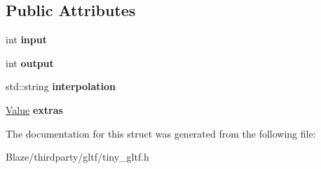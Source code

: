 \subsection*{Public Attributes}
\begin{DoxyCompactItemize}
\item 
\mbox{\label{structtinygltf_1_1AnimationSampler_a8d43a65089ccc4198cb583b785aa16fb}} 
int {\bfseries input}
\item 
\mbox{\label{structtinygltf_1_1AnimationSampler_abb40bab6d2e1fdb95e6f8551307810fa}} 
int {\bfseries output}
\item 
\mbox{\label{structtinygltf_1_1AnimationSampler_ada98770a424036042363c8b967e56061}} 
std\+::string {\bfseries interpolation}
\item 
\mbox{\label{structtinygltf_1_1AnimationSampler_a8cb94861de6b81983a6a630b469214e4}} 
\hyperlink{classtinygltf_1_1Value}{Value} {\bfseries extras}
\end{DoxyCompactItemize}


The documentation for this struct was generated from the following file\+:\begin{DoxyCompactItemize}
\item 
Blaze/thirdparty/gltf/tiny\+\_\+gltf.\+h\end{DoxyCompactItemize}

